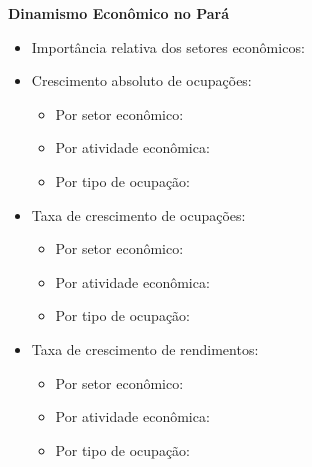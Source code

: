 \documentclass[10pt]{beamer}
\begin{document}
\begin{frame}[label=indice_principal_amz_pa]{}

\textit{\hyperlink{indice_principal}{}}

\textbf{Dinamismo Econômico no Pará}
\vspace{2mm}

\begin{itemize}

\item{Importância relativa dos setores econômicos: \hyperlink{_amz_pa_importancia_relativa}{}}
\vspace{1mm}

\item{Crescimento  absoluto de ocupações:
	\begin{itemize}
	\item{Por setor econômico: \hyperlink{amzparkngnocuporsetor}{}}
	\item{Por atividade econômica: \hyperlink{amzparkngnocuporatividade}{}}
	\item{Por tipo de ocupação: \hyperlink{amzparkngnocuporocupacao}{}}
	\end{itemize}
}
\vspace{1mm}

\item{Taxa de crescimento de ocupações:
	\begin{itemize}
	\item{Por setor econômico: \hyperlink{amzparkngtxocuporsetor}{}}
	\item{Por atividade econômica: \hyperlink{amzparkngtxocuporatividade}{}}
	\item{Por tipo de ocupação: \hyperlink{amzparkngtxocuporocupacao}{}}
	\end{itemize}
}
\vspace{1mm}

\item{Taxa de crescimento de rendimentos:
	\begin{itemize}
	\item{Por setor econômico: \hyperlink{amzparkngtxrendaporsetor}{}}
	\item{Por atividade econômica: \hyperlink{amzparkngtxrendaporatividade}{}}
	\item{Por tipo de ocupação: \hyperlink{amzparkngtxrendaporocupacao}{}}
	\end{itemize}
}
\vspace{1mm}

\end{itemize}

\end{frame}
\end{document}
